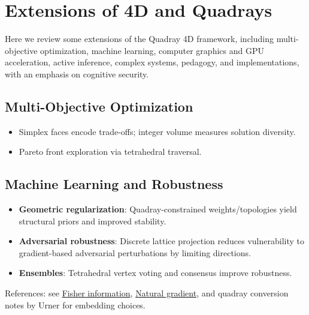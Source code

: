 \documentclass[
  10pt,
]{article}
\providecommand{\tightlist}{%
  \setlength{\itemsep}{0pt}\setlength{\parskip}{0pt}}
\begin{document}
\newpage

\hypertarget{extensions-of-4d-and-quadrays}{%
\section{Extensions of 4D and
Quadrays}\label{extensions-of-4d-and-quadrays}}

Here we review some extensions of the Quadray 4D framework, including
multi-objective optimization, machine learning, computer graphics and
GPU acceleration, active inference, complex systems, pedagogy, and
implementations, with an emphasis on cognitive security.

\hypertarget{multi-objective-optimization}{%
\subsection{Multi-Objective
Optimization}\label{multi-objective-optimization}}

\begin{itemize}
\tightlist
\item
  Simplex faces encode trade-offs; integer volume measures solution
  diversity.
\item
  Pareto front exploration via tetrahedral traversal.
\end{itemize}

\hypertarget{machine-learning-and-robustness}{%
\subsection{Machine Learning and
Robustness}\label{machine-learning-and-robustness}}

\begin{itemize}
\tightlist
\item
  \textbf{Geometric regularization}: Quadray-constrained
  weights/topologies yield structural priors and improved stability.
\item
  \textbf{Adversarial robustness}: Discrete lattice projection reduces
  vulnerability to gradient-based adversarial perturbations by limiting
  directions.
\item
  \textbf{Ensembles}: Tetrahedral vertex voting and consensus improve
  robustness.
\end{itemize}

References: see
\href{https://en.wikipedia.org/wiki/Fisher_information}{Fisher
information},
\href{https://en.wikipedia.org/wiki/Natural_gradient}{Natural gradient},
and quadray conversion notes by Urner for embedding choices.
\end{document}
